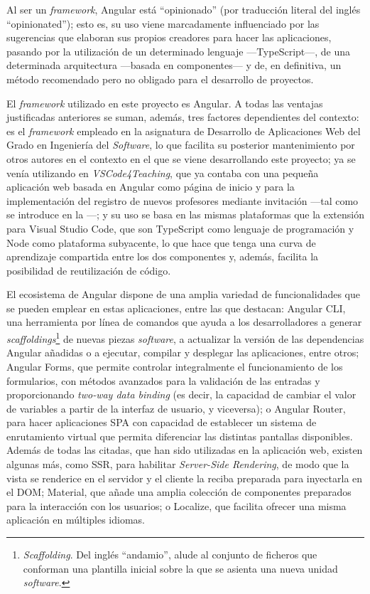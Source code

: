 Al ser un \textit{framework}, Angular está ``opinionado'' (por traducción literal del inglés ``opinionated''); esto es, su uso viene marcadamente influenciado por las sugerencias que elaboran sus propios creadores para hacer las aplicaciones, pasando por la utilización de un determinado lenguaje ---TypeScript---, de una determinada arquitectura ---basada en componentes--- y de, en definitiva, un método recomendado pero no obligado para el desarrollo de proyectos.

El \textit{framework} utilizado en este proyecto es Angular. A todas las ventajas justificadas anteriores se suman, además, tres factores dependientes del contexto: es el \textit{framework} empleado en la asignatura de Desarrollo de Aplicaciones Web del Grado en Ingeniería del \textit{Software}, lo que facilita su posterior mantenimiento por otros autores en el contexto en el que se viene desarrollando este proyecto; ya se venía utilizando en \textit{VSCode4Teaching}, que ya contaba con una pequeña aplicación web basada en Angular como página de inicio y para la implementación del registro de nuevos profesores mediante invitación ---tal como se introduce en la ---; y su uso se basa en las mismas plataformas que la extensión para Visual Studio Code, que son TypeScript como lenguaje de programación y Node como plataforma subyacente, lo que hace que tenga una curva de aprendizaje compartida entre los dos componentes y, además, facilita la posibilidad de reutilización de código.

El ecosistema de Angular dispone de una amplia variedad de funcionalidades que se pueden emplear en estas aplicaciones, entre las que destacan: Angular CLI, una herramienta por línea de comandos que ayuda a los desarrolladores a generar \textit{scaffoldings}\footnote{\textit{Scaffolding}. Del inglés ``andamio'', alude al conjunto de ficheros que conforman una plantilla inicial sobre la que se asienta una nueva unidad \textit{software}.} de nuevas piezas \textit{software}, a actualizar la versión de las dependencias Angular añadidas o a ejecutar, compilar y desplegar las aplicaciones, entre otros; Angular Forms, que permite controlar integralmente el funcionamiento de los formularios, con métodos avanzados para la validación de las entradas y proporcionando \textit{two-way data binding} (es decir, la capacidad de cambiar el valor de variables a partir de la interfaz de usuario, y viceversa); o Angular Router, para hacer aplicaciones SPA con capacidad de establecer un sistema de enrutamiento virtual que permita diferenciar las distintas pantallas disponibles. Además de todas las citadas, que han sido utilizadas en la aplicación web, existen algunas más, como SSR, para habilitar \textit{Server-Side Rendering}, de modo que la vista se renderice en el servidor y el cliente la reciba preparada para inyectarla en el DOM; Material, que añade una amplia colección de componentes preparados para la interacción con los usuarios; o Localize, que facilita ofrecer una misma aplicación en múltiples idiomas.

